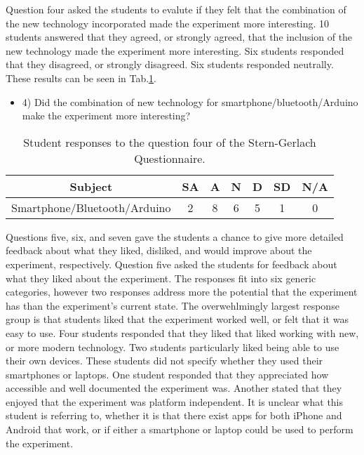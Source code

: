 Question four asked the students to evalute if they felt that the combination of the new technology incorporated made the experiment more interesting.
10 students answered that they agreed, or strongly agreed, that the inclusion of the new technology made the experiment more interesting.
Six students responded that they disagreed, or strongly disagreed.
Six students responded neutrally.
These results can be seen in Tab.\ref{tab:t14q4}.

\begin{table}[htpb]
  \scriptsize
  \begin{center}
    \caption{\scriptsize Student responses to the question four of the Stern-Gerlach Questionnaire.}
    \label{tab:t14q4}
    \begin{itemize}
    \item  4) Did the combination of new technology for smartphone/bluetooth/Arduino make the experiment more interesting?
    \end{itemize}
    

    \begin{tabular}{|c | c | c | c | c | c | c|}
      \hline
      Subject & SA & A & N & D & SD & N/A\\
      \hline
      Smartphone/Bluetooth/Arduino & 2 & 8 & 6 & 5 & 1 & 0\\
      \hline
    \end{tabular}
  \end{center}%
\end{table}

Questions five, six, and seven gave the students a chance to give more detailed feedback about what they liked, disliked, and would improve about the experiment, respectively.
Question five asked the students for feedback about what they liked about the experiment.
The responses fit into six generic categories, however two responses address more the potential that the experiment has than the experiment's current state.
The overwehlmingly largest response group is that students liked that the experiment worked well, or felt that it was easy to use.
Four students responded that they liked that liked working with new, or more modern technology.
Two students particularly liked being able to use their own devices.
These students did not specify whether they used their smartphones or laptops.
One student responded that they appreciated how accessible and well documented the experiment was.
Another stated that they enjoyed that the experiment was platform independent.
It is unclear what this student is referring to, whether it is that there exist apps for both iPhone and Android that work, or if either a smartphone or laptop could be used to perform the experiment.

